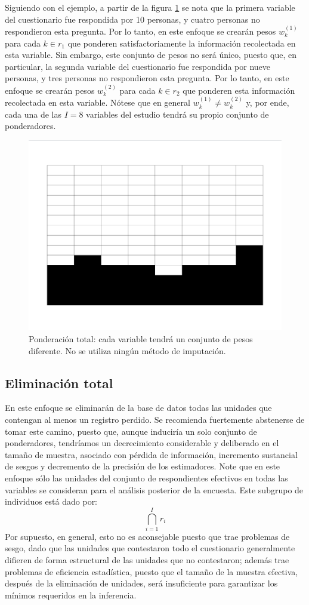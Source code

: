 \documentclass[
  12pt,
]{book}
\begin{document}
Siguiendo con el ejemplo, a partir de la figura \ref{fig:figpondtotal} se nota que la primera variable del cuestionario fue respondida por 10 personas, y cuatro personas no respondieron esta pregunta. Por lo tanto, en este enfoque se crearán pesos \(w_k^{(1)}\) para cada \(k\in r_1\) que ponderen satisfactoriamente la información recolectada en esta variable. Sin embargo, este conjunto de pesos no será único, puesto que, en particular, la segunda variable del cuestionario fue respondida por nueve personas, y tres personas no respondieron esta pregunta. Por lo tanto, en este enfoque se crearán pesos \(w_k^{(2)}\) para cada \(k\in r_2\) que ponderen esta información recolectada en esta variable. Nótese que en general \(w_k^{(1)} \neq w_k^{(2)}\) y, por ende, cada una de las \(I=8\) variables del estudio tendrá su propio conjunto de ponderadores.

\begin{figure}
\includegraphics[width=0.5\linewidth]{Pics/j4} \caption{Ponderación total: cada variable tendrá un conjunto de pesos diferente. No se utiliza ningún método de imputación.}\label{fig:figpondtotal}
\end{figure}

\hypertarget{eliminaciuxf3n-total}{%
\subsection{Eliminación total}\label{eliminaciuxf3n-total}}

En este enfoque se eliminarán de la base de datos todas las unidades que contengan al menos un registro perdido. Se recomienda fuertemente abstenerse de tomar este camino, puesto que, aunque induciría un solo conjunto de ponderadores, tendríamos un decrecimiento considerable y deliberado en el tamaño de muestra, asociado con pérdida de información, incremento sustancial de sesgos y decremento de la precisión de los estimadores. Note que en este enfoque sólo las unidades del conjunto de respondientes efectivos en todas las variables se consideran para el análisis posterior de la encuesta. Este subgrupo de individuos está dado por:
\[
\bigcap_{i=1}^I r_i
\]
Por supuesto, en general, esto no es aconsejable puesto que trae problemas de sesgo, dado que las unidades que contestaron todo el cuestionario generalmente difieren de forma estructural de las unidades que no contestaron; además trae problemas de eficiencia estadística, puesto que el tamaño de la muestra efectiva, después de la eliminación de unidades, será insuficiente para garantizar los mínimos requeridos en la inferencia.
\end{document}
